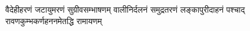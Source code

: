 
{वैदेहीहरणं जटायुमरणं सुग्रीवसम्भाषणम्}
{वालीनिर्दलनं समुद्रतरणं लङ्कापुरीदाहनं}
{पश्चाद् रावणकुम्भकर्णहननमेतद्धि रामायणम्}